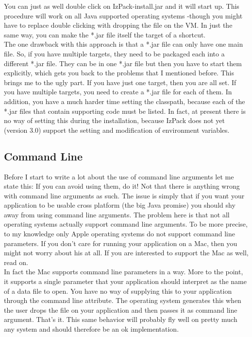 You can just as well double click on IzPack-install.jar and it will
start up. This procedure will work on all Java supported operating
systems -though you might have to replace double clicking with dropping
the file on the VM. In just the same way, you can make the *.jar file
itself the target of a shortcut.\\

The one drawback with this approach is that a *.jar file can only have
one main file. So, if you have multiple targets, they need to be
packaged each into a different *.jar file. They can be in one *.jar file
but then you have to start them explicitly, which gets you back to the
problems that I mentioned before. This brings me to the ugly part. If
you have just one target, then you are all set. If you have multiple
targets, you need to create a *.jar file for each of them. In addition,
you have a much harder time setting the classpath, because each of the
*.jar files that contain supporting code must be listed. In fact, at
present there is no way of setting this during the installation, because
IzPack does not yet (version 3.0) support the setting and modification
of environment variables.\\

\subsection{Command Line}

Before I start to write a lot about the use of command line arguments
let me state this: If you can avoid using them, do it! Not that there
is anything wrong with command line arguments as such. The issue is
simply that if you want your application to be usable cross platform
(the big Java promise) you should shy away from using command line
arguments. The problem here is that not all operating systems actually
support command line arguments. To be more precise, to my knowledge only
Apple operating systems do not support command line parameters. If you
don't care for running your application on a Mac, then you might not
worry about his at all. If you are interested to support the Mac as
well, read on.\\

In fact the Mac supports command line parameters in a way. More to the
point, it supports a single parameter that your application should
interpret as the name of a data file to open. You have no way of
supplying this to your application through the command line attribute.
The operating system generates this when the user drops the file on your
application and then passes it as command line argument. That's it. This
same behavior will probably fly well on pretty much any system and
should therefore be an ok implementation.\\

